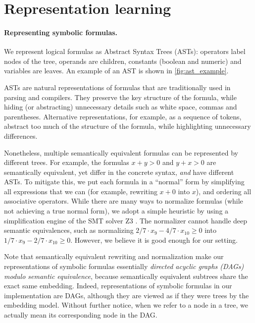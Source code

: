 \section{Representation learning}
\newcommand{\treelstm}{\textsc{TreeLSTM}\xspace}
\newcommand{\R}{\mathbb{R}}
\label{chap:rep-learning}
\paragraph{Representing symbolic formulas.}
We represent logical formulas as Abstract Syntax Trees (ASTs): operators label nodes of the tree, operands are children, constants (boolean and numeric) and variables are leaves. 
An example of an AST is shown in \cref{fig:ast_example}.

ASTs are natural representations of formulas that are traditionally used in parsing and compilers. They preserve the key structure of the formula, while hiding (or abstracting) unnecessary details such as white space, commas and parentheses. Alternative representations, for example, as a sequence of tokens, abstract too much of the structure of the formula, while highlighting unnecessary differences.



Nonetheless, multiple semantically equivalent formulas can be represented by different trees. For example, the formulas $x + y > 0$ and $y + x > 0$ are semantically equivalent, yet differ in the concrete syntax, \emph{and} have different ASTs. To mitigate this, we put each formula in a ``normal'' form by simplifying all expressions that we can (for example, rewriting $x + 0$ into $x$), and ordering all associative operators. While there are many ways to normalize formulas (while not achieving a true normal form), we adopt a simple heuristic by using a simplification engine of the SMT solver Z3 \cite{z3}.
The normalizer cannot handle deep semantic equivalences, such as normalizing $2/7 \cdot x_9 - 4/7 \cdot x_{10} \geq 0$ into $1/7\cdot x_9 - 2/7 \cdot x_{10} \geq 0$. However, we believe it is good enough for our setting.

Note that semantically equivalent rewriting and normalization make our representations of symbolic formulas essentially \textit{directed acyclic graphs (DAGs) modulo semantic equivalence}, because semantically equivalent subtrees share the exact same embedding. Indeed, representations of symbolic formulas in our implementation are DAGs, although they are viewed as if they were trees by the embedding model. Without further notice, when we refer to a node in a tree, we actually mean its corresponding node in the DAG.

